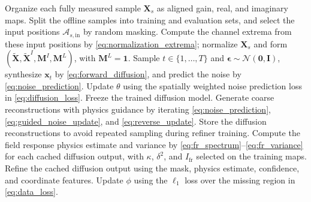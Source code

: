 \documentclass[lettersize,journal]{IEEEtran}
\newcommand{\vect}[1]{\boldsymbol{#1}}
\newcommand{\mat}[1]{\mathbf{#1}}
\begin{document}
\begin{algorithm}[t]
\caption{Offline Training of the Two PIDR-Net Stages}
\label{alg:offline_training}
\begin{algorithmic}[1]
\STATE Organize each fully measured sample $\mat{X}_s$ as aligned gain, real, and imaginary maps.
\STATE Split the offline samples into training and evaluation sets, and select the input positions $\mathcal{A}_{s,\mathrm{in}}$ by random masking.
\STATE Compute the channel extrema from these input positions by \eqref{eq:normalization_extrema}; normalize $\mat{X}_s$ and form $(\widetilde{\mat{X}},\widetilde{\mat{X}}^{I},\mat{M}^{I},\mat{M}^{L})$, with $\mat{M}^{L}=\mat{1}$.
    \STATE Sample $t\in\{1,\ldots,T\}$ and $\vect{\epsilon}\sim\mathcal{N}(\mat{0},\mat{I})$, synthesize $\mat{x}_t$ by \eqref{eq:forward_diffusion}, and predict the noise by \eqref{eq:noise_prediction}.
    \STATE Update $\theta$ using the spatially weighted noise prediction loss in \eqref{eq:diffusion_loss}.
\ENDFOR
\STATE Freeze the trained diffusion model.
\STATE Generate coarse reconstructions with physics guidance by iterating \eqref{eq:noise_prediction}, \eqref{eq:guided_noise_update}, and \eqref{eq:reverse_update}.
\STATE Store the diffusion reconstructions to avoid repeated sampling during refiner training.
    \STATE Compute the field response physics estimate and variance by \eqref{eq:fr_spectrum}--\eqref{eq:fr_variance} for each cached diffusion output, with $\kappa$, $\delta^{2}$, and $I_{\mathrm{fr}}$ selected on the training maps.
    \STATE Refine the cached diffusion output using the mask, physics estimate, confidence, and coordinate features.
    \STATE Update $\phi$ using the $\ell_1$ loss over the missing region in \eqref{eq:data_loss}.
\ENDFOR
\end{algorithmic}
\end{algorithm}
\end{document}
